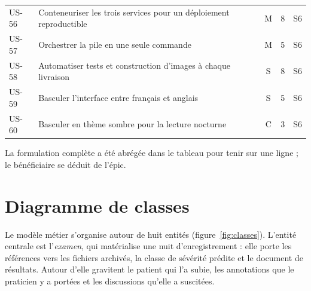 \begin{longtable}{@{}p{1.25cm}L{9.1cm}cp{0.75cm}p{0.9cm}@{}}
US-56 & Conteneuriser les trois services pour un déploiement reproductible
& M & 8 & S6 \\
US-57 & Orchestrer la pile en une seule commande & M & 5 & S6 \\
US-58 & Automatiser tests et construction d'images à chaque livraison & S & 8 & S6 \\
US-59 & Basculer l'interface entre français et anglais & S & 5 & S6 \\
US-60 & Basculer en thème sombre pour la lecture nocturne & C & 3 & S6 \\
\end{longtable}

\noindent
La formulation complète a été abrégée dans le tableau pour tenir sur une ligne ; le
bénéficiaire se déduit de l'épic.

\section{Diagramme de classes}

Le modèle métier s'organise autour de huit entités (figure~\ref{fig:classes}).
L'entité centrale est l'\emph{examen}, qui matérialise une nuit d'enregistrement : elle
porte les références vers les fichiers archivés, la classe de sévérité prédite et le
document de résultats. Autour d'elle gravitent le patient qui l'a subie, les annotations
que le praticien y a portées et les discussions qu'elle a suscitées.

